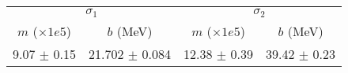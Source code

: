 \begin{tabular}{cc|cc}
\multicolumn{2}{c|}{$\sigma_1$} & \multicolumn{2}{|c}{$\sigma_2$} \\
$m$ ($\times1e5$) & $b$ (MeV) & $m$ ($\times1e5$) & $b$ (MeV) \\
\hline
9.07 $\pm$ 0.15 & 21.702 $\pm$ 0.084 & 12.38 $\pm$ 0.39 & 39.42 $\pm$ 0.23\\
\end{tabular}
